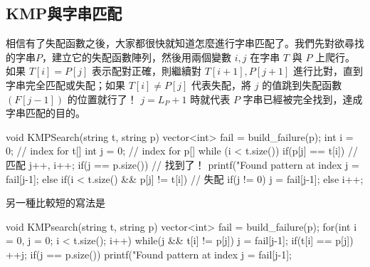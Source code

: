\subsection{KMP與字串匹配}

相信有了失配函數之後，大家都很快就知道怎麼進行字串匹配了。我們先對欲尋找的字串$P$，建立它的失配函數陣列，然後用兩個變數 $i, j$ 在字串 $T$ 與 $P$ 上爬行。\\

如果 $T[i] = P[j]$ 表示配對正確，則繼續對 $T[i+1], P[j+1]$ 進行比對，直到字串完全匹配或失配；如果 $T[i] \neq P[j]$ 代表失配，將 $j$ 的值跳到失配函數 $(F[j-1])$ 的位置就行了！ $j = L_P+1$ 時就代表 $P$ 字串已經被完全找到，達成字串匹配的目的。

\begin{C++}
void KMPSearch(string t, string p){
    vector<int> fail = build_failure(p);
    int i = 0; // index for t[]
    int j = 0; // index for p[]
    while (i < t.size()){
        if(p[j] == t[i]){ // 匹配
            j++, i++;
        }
        if(j == p.size()){ // 找到了！
            printf("Found pattern at index %
            j = fail[j-1];
        }
        else if(i < t.size() && p[j] != t[i]){ // 失配
            if(j != 0) j = fail[j-1];
            else i++;
        }
    }
}
\end{C++}
另一種比較短的寫法是
\begin{C++}
void KMPsearch(string t, string p) {
	vector<int> fail = build_failure(p);
	for(int i = 0, j = 0; i < t.size(); i++) {
		while(j && t[i] != p[j]) j = fail[j-1];
		if(t[i] == p[j]) ++j;
		if(j == p.size()) {
			printf("Found pattern at index %
			j = fail[j-1];
		}
	}
}
\end{C++}

